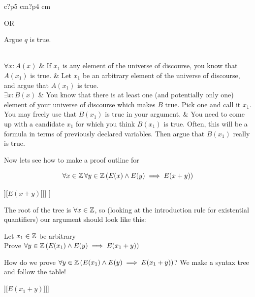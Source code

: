 \begin{table}[h]
\begin{tabular}{c?p{5 cm}?p{4 cm}}
		\medskip
		
		OR
		
		\medskip
		
		Argue $q$ is true.

		\\ \hline
		$\forall x: A(x)$ & If $x_1$ is any element of the universe of discourse, you know that $A(x_1)$ is true. &  Let $x_1$ be an arbitrary element of the universe of discourse, and argue that $A(x_1)$ is true. \\ \hline
		$\exists x: B(x)$ & You know that there is at least one (and potentially only one) element of your universe of discourse which makes $B$ true.  Pick one and call it $x_1$.  You may freely use that $B(x_1)$ is true in your argument. &  You need to come up with a candidate $x_1$ for which you think $B(x_1)$ is true.  Often, this will be a formula in terms of previously declared variables.  Then argue that $B(x_1)$ really is true.
	\end{tabular}
\end{table}

\newpage


Now lets see how to make a proof outline for 

$$
\forall x \in \mathbb{Z} \, \forall y \in \mathbb{Z} \left( E(x) \wedge E(y) \implies E(x+y) \right)
$$

\begin{center}
	\begin{forest}
		[$\forall x \in \Z$[$\forall y \in \Z$[$\implies$[$\wedge$[$E(x)$][$E(y)$]][$E(x+y)$]]]
		]
	\end{forest}
\end{center}

The root of the tree is $\forall x \in \Z$, so (looking at the introduction rule for existential quantifiers) our argument should look like this:

\begin{fitch*}
		\textrm{Let $x_1 \in \mathbb{Z}$ be arbitrary}\\
		\textrm{Prove $\forall y \in \mathbb{Z} \left( E(x_1) \wedge E(y) \implies E(x_1+y) \right)$}\\
	\end{fitch*}

How do we prove $\forall y \in \mathbb{Z} \left( E(x_1) \wedge E(y) \implies E(x_1+y) \right)$?  We make a syntax tree and follow the table!

\begin{center}
	\begin{forest}
		[$\forall y \in \Z$[$\implies$[$\wedge$[$E(x_1)$][$E(y)$]][$E(x_1+y)$]]]
	\end{forest}
\end{center}

